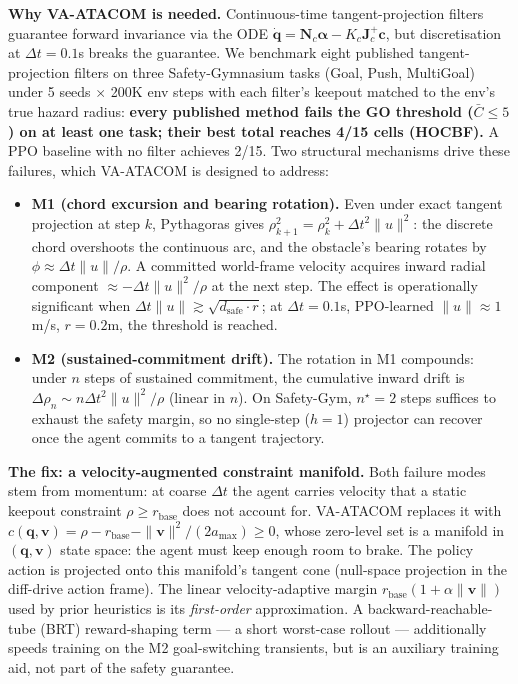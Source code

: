 \documentclass[letterpaper]{article}
\begin{document}
\textbf{Why VA-ATACOM is needed.} Continuous-time tangent-projection filters guarantee forward invariance via the ODE $\dot{\boldsymbol{q}} = \boldsymbol{N}_c\boldsymbol{\alpha} - K_c\boldsymbol{J}_c^{+}\boldsymbol{c}$, but discretisation at $\Delta t = 0.1$s breaks the guarantee. We benchmark eight published tangent-projection filters on three Safety-Gymnasium tasks (Goal, Push, MultiGoal) under 5 seeds $\times$ 200K env steps with each filter's keepout matched to the env's true hazard radius: \textbf{every published method fails the GO threshold ($\bar{C} \le 5$) on at least one task; their best total reaches 4/15 cells (HOCBF).} A PPO baseline with no filter achieves 2/15. Two structural mechanisms drive these failures, which VA-ATACOM is designed to address:

\begin{itemize}
\item \textbf{M1 (chord excursion and bearing rotation).} Even under exact tangent projection at step $k$, Pythagoras gives $\rho_{k+1}^2 = \rho_k^2 + \Delta t^2 \|u\|^2$: the discrete chord overshoots the continuous arc, and the obstacle's bearing rotates by $\phi \approx \Delta t\|u\|/\rho$. A committed world-frame velocity acquires inward radial component $\approx -\Delta t\|u\|^2/\rho$ at the next step. The effect is operationally significant when $\Delta t \|u\| \gtrsim \sqrt{d_\text{safe} \cdot r}$; at $\Delta t = 0.1$s, PPO-learned $\|u\| \approx 1$m/s, $r = 0.2$m, the threshold is reached.

\item \textbf{M2 (sustained-commitment drift).} The rotation in M1 compounds: under $n$ steps of sustained commitment, the cumulative inward drift is $\Delta\rho_n \sim n\Delta t^2 \|u\|^2/\rho$ (linear in $n$). On Safety-Gym, $n^\star = 2$ steps suffices to exhaust the safety margin, so no single-step ($h{=}1$) projector can recover once the agent commits to a tangent trajectory.
\end{itemize}

\textbf{The fix: a velocity-augmented constraint manifold.} Both failure modes stem from momentum: at coarse $\Delta t$ the agent carries velocity that a static keepout constraint $\rho \ge r_\text{base}$ does not account for. VA-ATACOM replaces it with $c(\boldsymbol{q},\boldsymbol{v}) = \rho - r_\text{base} - \|\boldsymbol{v}\|^2/(2a_{\max}) \ge 0$, whose zero-level set is a manifold in $(\boldsymbol{q},\boldsymbol{v})$ state space: the agent must keep enough room to brake. The policy action is projected onto this manifold's tangent cone (null-space projection in the diff-drive action frame). The linear velocity-adaptive margin $r_\text{base}(1+\alpha\|\boldsymbol{v}\|)$ used by prior heuristics is its \emph{first-order} approximation. A backward-reachable-tube (BRT) reward-shaping term --- a short worst-case rollout --- additionally speeds training on the M2 goal-switching transients, but is an auxiliary training aid, not part of the safety guarantee.
\end{document}
